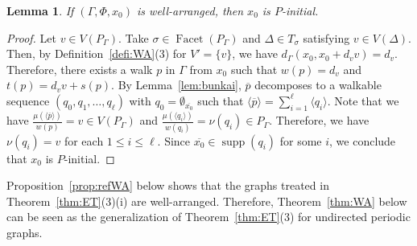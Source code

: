 \documentclass[10pt,a4paper]{amsart}
\theoremstyle{plain}
\newtheorem{lem}[cdrthm]{Lemma}
\theoremstyle{definition}
\theoremstyle{remark}
\begin{document}
\begin{lem}\label{lem:WAPI}
If $(\Gamma, \Phi, x_0)$ is well-arranged, then $x_0$ is $P$-initial. 
\end{lem}
\begin{proof}
Let $v \in V(P_{\Gamma})$. 
Take $\sigma \in \operatorname{Facet}(P_{\Gamma})$ and $\Delta \in T_{\sigma}$ satisfying $v \in V(\Delta)$. 
Then, by Definition~\ref{defi:WA}(3) for $V' = \{ v \}$, we have $d_{\Gamma}(x_0, x_0 + d_v v) = d_v$. 
Therefore, there exists a walk $p$ in $\Gamma$ from $x_0$ such that $w(p) = d_v$ and 
$t(p) = d_v v + s(p)$. 
By Lemma~\ref{lem:bunkai}, $\overline{p}$ decomposes to a walkable sequence $(q_0, q_1, \ldots , q_{\ell})$ with $q_0 = \emptyset _{\overline{x_0}}$ such that 
$\langle \overline{p} \rangle = \sum _{i = 1} ^{\ell} \langle q_i \rangle$. 
Note that we have 
$\frac{\mu(\langle \overline{p} \rangle)}{w(p)} = v \in V(P_{\Gamma})$ and 
$\frac{\mu(\langle q_i \rangle)}{w(q_i)} = \nu(q_i) \in P_{\Gamma}$. 
Therefore, we have $\nu(q_i) = v$ for each $1 \le i \le \ell$. 
Since $\overline{x_0} \in \operatorname{supp}(q_i)$ for some $i$, we conclude that $x_0$ is $P$-initial. 
\end{proof}

Proposition~\ref{prop:refWA} below shows that the graphs treated in Theorem~\ref{thm:ET}(3)(i) are well-arranged. 
Therefore, Theorem~\ref{thm:WA} below can be seen as the generalization of 
Theorem~\ref{thm:ET}(3) for undirected periodic graphs. 
\end{document}
